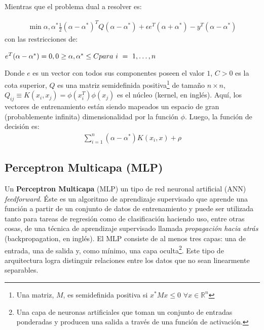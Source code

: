   Mientras que el problema dual a resolver es:

  \begin{align}
    \min\limits{\alpha, \alpha^{*}} \frac{1}{2} (\alpha - \alpha^{*})^{T}
    Q(\alpha - \alpha^{*}) + \epsilon e^{T} (\alpha + \alpha^{*}) -
    y^{T} (\alpha - \alpha^{*})
  \end{align}
  con las restricciones de:

  \begin{math}
    e^{T} (\alpha - \alpha^{*}) = 0, \\
    0 \geq \alpha, \alpha^{*} \leq C \\
    para\ i\ =\ 1, \dots, n
  \end{math}

  Donde $e$ es un vector con todos sus componentes poseen el valor $1$, $C > 0$
  es la cota superior, $Q$ es una matriz semidefinida
  positiva\footnote{Una matriz, $M$, es semidefinida positiva si $x^{*}Mx \leq 0$
  $\forall x \in \mathbb{R}^{n}$} de tamaño $n \times n$,
  $Q_{ij} \equiv K(x_{i}, x_{j}) = \phi(x_{i}^{T})\phi(x_{j})$ es el núcleo
  (kernel, en inglés). Aquí, los vectores de entrenamiento están siendo mapeados
  un espacio de gran (probablemente infinita) dimensionalidad por la función
  $\phi$.
  Luego, la función de decisión es:
  \begin{align}
    \sum_{i = 1}^{n} (\alpha - \alpha^{*})K(x_{i}, x) + \rho
  \end{align}

\subsection{Perceptron Multicapa (MLP)}
Un \textbf{Perceptron Multicapa} (MLP) un tipo de red neuronal artificial (ANN)
\textit{feedforward}. Éste es un algoritmo de aprendizaje supervisado que
aprende una función a partir de un conjunto de datos de entrenamiento y puede ser
utilizada tanto para tareas de regresión como de clasificación haciendo uso, entre
otras cosas, de una técnica de aprendizaje supervisado llamada
\textit{propagación hacia atrás}\cite{backpropagation} (backpropagation, en inglés).
El MLP consiste de al menos tres capas: una de entrada, una de salida y,
como mínimo, una
capa oculta\footnote{Una capa de neuronas artificiales que toman un conjunto
de entradas ponderadas y producen una salida a través de una función de activación.}.
Este tipo de arquitectura logra distinguir relaciones entre los datos que no sean
linearmente separables.

